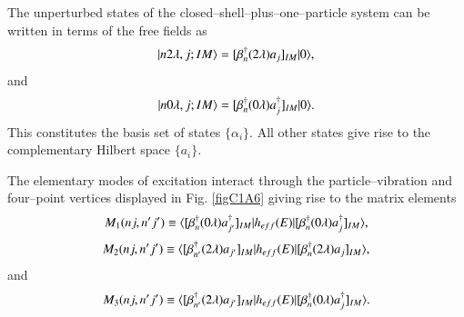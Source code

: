 The unperturbed states of the closed--shell--plus--one--particle system can be written in terms of the free fields as 
  \begin{align}\label{eqC1A81} 
   |{n2\lambda,j;IM} \rangle=[\beta^\dagger_n(2\lambda)a_j]_{IM}|{0} \rangle,
    \end{align}  
and 
  \begin{align}\label{eqC1A82} 
   |{n0\lambda,j;IM} \rangle=[\beta^\dagger_n(0\lambda)a^\dagger_j]_{IM}|{0} \rangle.
    \end{align}   
This constitutes the basis set of states $\{\alpha_i\}$. All other states give rise to the complementary Hilbert space $\{a_i\}$. 


The elementary modes of excitation interact through the particle--vibration and four--point vertices displayed in Fig. \ref{figC1A6} giving rise to the matrix elements 
  \begin{align}\label{eqC1A83} 
   M_1(nj,n'j')\equiv \langle {[\beta^\dagger_n(0\lambda)a^\dagger_{j'}]_{IM}|h_{eff}(E)|[\beta^\dagger_n(0\lambda)a^\dagger_j]_{IM}} \rangle,
    \end{align}   
  \begin{align}\label{eqC1A84} 
   M_2(nj,n'j')\equiv \langle {[\beta^\dagger_{n'}(2\lambda)a_{j'}]_{IM}|h_{eff}(E)|[\beta^\dagger_n(2\lambda)a_j]_{IM}} \rangle,
    \end{align}    
and 
  \begin{align}\label{eqC1A85} 
   M_3(nj,n'j')\equiv \langle {[\beta^\dagger_{n'}(2\lambda)a_{j'}]_{IM}|h_{eff}(E)|[\beta^\dagger_{n}(0\lambda)a^\dagger_j]_{IM}} \rangle.
    \end{align}   
